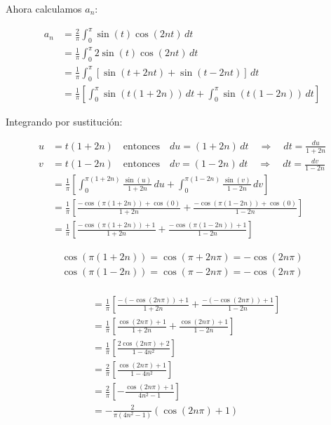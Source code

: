 \documentclass[12pt,a4paper]{report}
\begin{document}
\begin{enumerate}[label=\alph*),left=0pt]
\begin{itemize}[left=0pt]
  Ahora calculamos \(a_n\):
  
  $$
  \begin{aligned}
    a_n &= \frac{2}{\pi} \int_0^\pi \sin(t) \cos(2nt) \, dt \\
        &= \frac{1}{\pi} \int_0^\pi 2 \sin(t) \cos(2nt) \, dt \\
        &= \frac{1}{\pi} \int_0^\pi \left[ \sin(t + 2nt) + \sin(t - 2nt) \right] \, dt \\
        &= \frac{1}{\pi} \left[ \int_0^\pi \sin(t(1 + 2n)) \, dt + \int_0^\pi \sin(t(1 - 2n)) \, dt \right]
  \end{aligned}
  $$
  
  Integrando por sustitución:
  
  $$
  \begin{aligned}
    u &= t(1 + 2n) \quad \text{entonces} \quad du = (1 + 2n) \, dt \quad \Longrightarrow \quad dt = \frac{du}{1 + 2n} \\
    v &= t(1 - 2n) \quad \text{entonces} \quad dv = (1 - 2n) \, dt \quad \Longrightarrow \quad dt = \frac{dv}{1 - 2n} \\
    &= \frac{1}{\pi} \left[ \int_0^{\pi(1+2n)} \frac{\sin(u)}{1+2n} \, du + \int_0^{\pi(1-2n)} \frac{\sin(v)}{1-2n} \, dv \right] \\
    &= \frac{1}{\pi} \left[ \frac{-\cos(\pi(1+2n)) + \cos(0)}{1+2n} + \frac{-\cos(\pi(1-2n)) + \cos(0)}{1-2n} \right] \\
    &= \frac{1}{\pi} \left[ \frac{-\cos(\pi(1+2n)) + 1}{1+2n} + \frac{-\cos(\pi(1-2n)) + 1}{1-2n} \right]
  \end{aligned}
  $$
  
  
  

  $$
  \begin{aligned}
  \cos(\pi(1+2n)) = \cos(\pi + 2n\pi) = -\cos(2n\pi) \\
  \cos(\pi(1-2n)) = \cos(\pi - 2n\pi) = -\cos(2n\pi) \\
  \end{aligned}
  $$

  $$
  \begin{aligned}
    &= \frac{1}{\pi} \left[ \frac{-(-\cos(2n\pi)) + 1}{1+2n} + \frac{-(-\cos(2n\pi)) + 1}{1-2n} \right] \\
    &= \frac{1}{\pi} \left[ \frac{\cos(2n\pi) + 1}{1+2n} + \frac{\cos(2n\pi) + 1}{1-2n} \right] \\
    &= \frac{1}{\pi} \left[ \frac{2\cos(2n\pi) + 2}{1 - 4n^2} \right] \\
    &= \frac{2}{\pi} \left[ \frac{\cos(2n\pi) + 1}{1 - 4n^2} \right] \\
    &= \frac{2}{\pi} \left[ -\frac{\cos(2n\pi) + 1}{4n^2 - 1} \right] \\
    &= -\frac{2}{\pi (4n^2 - 1)} (\cos(2n\pi) + 1)
  \end{aligned}
  $$
  

\end{itemize}
\end{enumerate}
\end{document}
